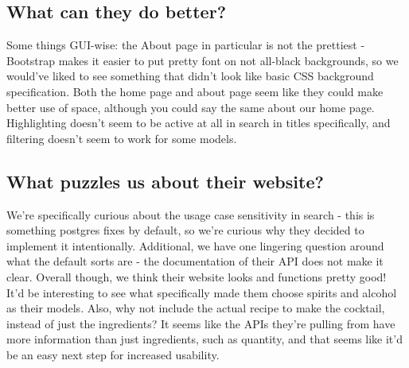 \documentclass{scrartcl}
\begin{document}
    \subsection*{What can they do better?}
    Some things GUI-wise: the About page in particular is not the prettiest - Bootstrap makes it easier to put pretty font on not all-black backgrounds, so we would've liked to see something that didn't look like basic CSS background specification. Both the home page and about page seem like they could make better use of space, although you could say the same about our home page. Highlighting doesn't seem to be active at all in search in titles specifically, and filtering doesn't seem to work for some models.
    \subsection*{What puzzles us about their website?}
    We're specifically curious about the usage case sensitivity in search - this is something postgres fixes by default, so we're curious why they decided to implement it intentionally. Additional, we have one lingering question around what the default sorts are - the documentation of their API does not make it clear. Overall though, we think their website looks and functions pretty good! It'd be interesting to see what specifically made them choose spirits and alcohol as their models. Also, why not include the actual recipe to make the cocktail, instead of just the ingredients? It seems like the APIs they're pulling from have more information than just ingredients, such as quantity, and that seems like it'd be an easy next step for increased usability.
\end{document}
